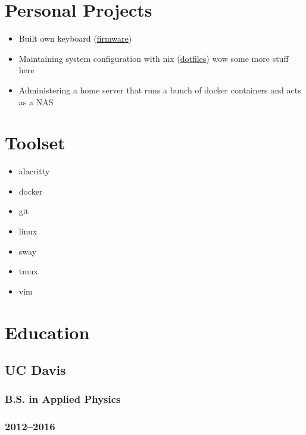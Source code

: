 \documentclass{article}
\begin{document}
\hspace{0.08\textwidth}
\begin{minipage}[t]{.3\textwidth}
\section*{Personal Projects}
\begin{itemize}
    \item Built own keyboard (\href{https://github.com/alejandro-angulo/qmk_firmware/tree/master/keyboards/crkbd/keymaps/alejandro-angulo}{firmware})
    \item Maintaining system configuration with nix (\href{https://github.com/alejandro-angulo/dotfiles/tree/nix-config}{dotfiles}) wow some more stuff here
    \item Administering a home server that runs a bunch of docker containers and acts as a NAS
\end{itemize}
\section*{Toolset}
\begin{itemize}
    \item alacritty
    \item docker
    \item git
    \item linux
    \item sway
    \item tmux
    \item vim
\end{itemize}
\section*{Education}
\subsection*{UC Davis}
\subsubsection*{B.S. in Applied Physics}
\subsubsection*{2012--2016}
\end{minipage}
\end{document}
